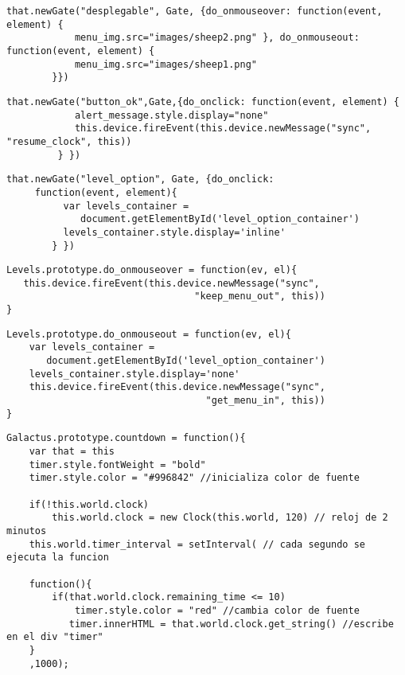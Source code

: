 \begin{lstlisting}[caption=newGate desplegable, label={lst:code5232}]
that.newGate("desplegable", Gate, {do_onmouseover: function(event, element) {
            menu_img.src="images/sheep2.png" }, do_onmouseout: function(event, element) {
            menu_img.src="images/sheep1.png"
        }})
\end{lstlisting}

\begin{lstlisting}[caption=newGate button\_ok, label={lst:code5233}]
that.newGate("button_ok",Gate,{do_onclick: function(event, element) {
            alert_message.style.display="none"
            this.device.fireEvent(this.device.newMessage("sync", "resume_clock", this))
         } })
\end{lstlisting}         

\begin{lstlisting}[caption=level\_option, label={lst:code5241}]
that.newGate("level_option", Gate, {do_onclick: 
     function(event, element){
          var levels_container = 
             document.getElementById('level_option_container')
          levels_container.style.display='inline'
        } })
\end{lstlisting}

\begin{lstlisting}[caption=do\_onmouseover, label={lst:code5251}]
Levels.prototype.do_onmouseover = function(ev, el){
   this.device.fireEvent(this.device.newMessage("sync",
                                 "keep_menu_out", this))
}
\end{lstlisting}

\begin{lstlisting}[caption=do\_onmouseout, label={lst:code5252}]
Levels.prototype.do_onmouseout = function(ev, el){
    var levels_container = 
       document.getElementById('level_option_container')
    levels_container.style.display='none'
    this.device.fireEvent(this.device.newMessage("sync",
                                   "get_menu_in", this))
}
\end{lstlisting}

\begin{lstlisting}[caption=do\_onmouseout, label={lst:code531}]
Galactus.prototype.countdown = function(){    
    var that = this
    timer.style.fontWeight = "bold"
    timer.style.color = "#996842" //inicializa color de fuente

    if(!this.world.clock)
        this.world.clock = new Clock(this.world, 120) // reloj de 2 minutos
    this.world.timer_interval = setInterval( // cada segundo se ejecuta la funcion
    
    function(){
        if(that.world.clock.remaining_time <= 10)
            timer.style.color = "red" //cambia color de fuente
           timer.innerHTML = that.world.clock.get_string() //escribe en el div "timer"
    }    
    ,1000);
\end{lstlisting}